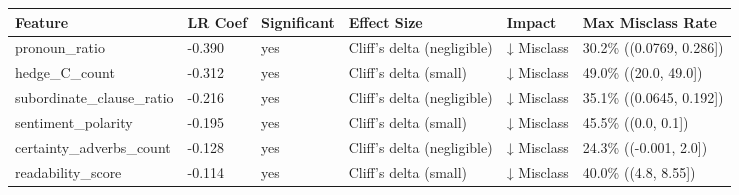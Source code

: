\begin{tabular}{llllll}
\toprule
Feature & LR Coef & Significant & Effect Size & Impact & Max Misclass Rate \\
\midrule
pronoun\_ratio & -0.390 & yes & Cliff's delta (negligible) & ↓ Misclass & 30.2\% ((0.0769, 0.286]) \\
hedge\_C\_count & -0.312 & yes & Cliff's delta (small) & ↓ Misclass & 49.0\% ((20.0, 49.0]) \\
subordinate\_clause\_ratio & -0.216 & yes & Cliff's delta (negligible) & ↓ Misclass & 35.1\% ((0.0645, 0.192]) \\
sentiment\_polarity & -0.195 & yes & Cliff's delta (small) & ↓ Misclass & 45.5\% ((0.0, 0.1]) \\
certainty\_adverbs\_count & -0.128 & yes & Cliff's delta (negligible) & ↓ Misclass & 24.3\% ((-0.001, 2.0]) \\
readability\_score & -0.114 & yes & Cliff's delta (small) & ↓ Misclass & 40.0\% ((4.8, 8.55]) \\
\bottomrule
\end{tabular}
